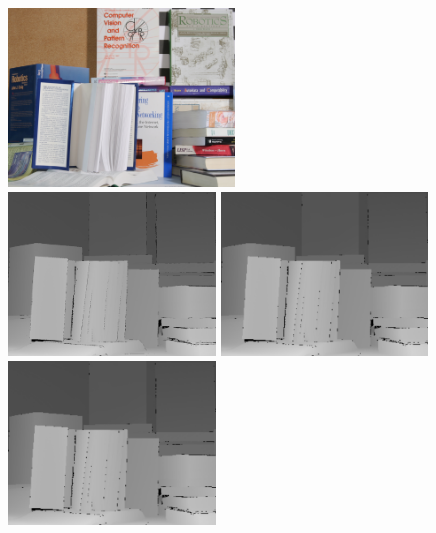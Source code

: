 \begin{figure}[t]
\begin{minipage}[b]{1\linewidth}
  \centering
  \centerline{\includegraphics[width=6cm]{depth_interp/quan_nhf_books/Books.png}}
\end{minipage}
\hfill
\begin{minipage}[b]{0.48\linewidth}
  \centering
  \centerline{\includegraphics[width=5.5cm]{depth_interp/quan_nhf_books/gt.png}}
\end{minipage}
\hfill
\begin{minipage}[b]{0.48\linewidth}
  \centering
  \centerline{\includegraphics[width=5.5cm]{depth_interp/quan_nhf_books/bl.png}}
\end{minipage}
%
\hfill
\begin{minipage}[b]{0.48\linewidth}
  \centering
  \centerline{\includegraphics[width=5.5cm]{depth_interp/quan_nhf_books/bc.png}}

\end{minipage}
\end{figure}
